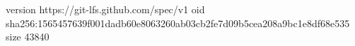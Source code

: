 version https://git-lfs.github.com/spec/v1
oid sha256:1565457639f001dadb60e8063260ab03cb2fe7d09b5cea208a9bc1e8df68e535
size 43840

